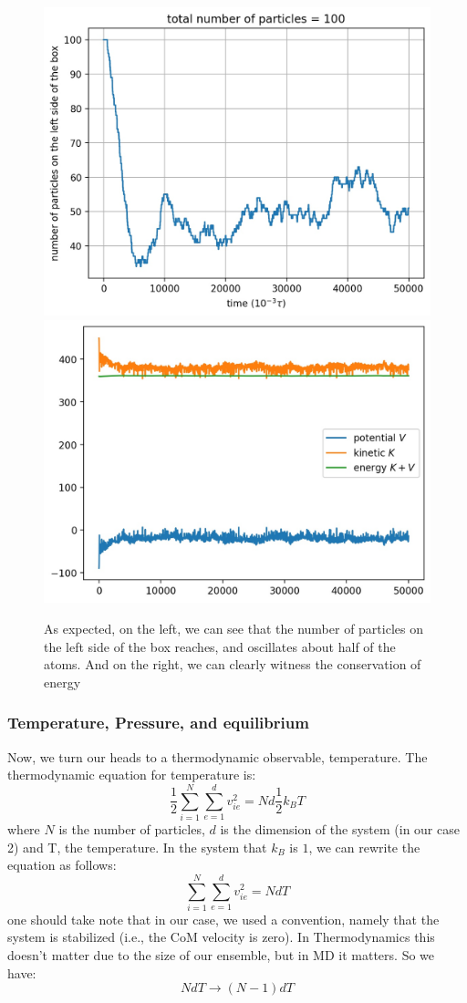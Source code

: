 \documentclass[12pt, a4paper]{article}
\begin{document}
	\begin{figure}[h!]
		\centering
		\includegraphics[width=.45\linewidth]{../results/particles_on_left100_50000.jpg}
		\includegraphics[width=.45\linewidth]{../results/energy_conservation100_50000.jpg}
		\caption{As expected, on the left, we can see that the number of particles on the 
		left side of the box reaches, and oscillates about half of the atoms. And on the right, we
		can clearly witness the conservation of energy}
		\label{fig:energy_and_left}
	\end{figure}

	\subsubsection{Temperature, Pressure, and equilibrium}
	Now, we turn our heads to a thermodynamic observable, temperature. The thermodynamic 
	equation for temperature is:
	\begin{equation}
		\frac{1}{2} \sum_{i=1}^{N}\sum_{e=1}^{d} v_{ie}^2 = Nd \frac{1}{2}k_B T
	\end{equation}
	where $N$ is the number of particles, $d$ is the dimension of the system (in our case 2) and 
	T, the temperature. In the system that $k_B$ is $1$, we can rewrite the equation as follows:
	\begin{equation}
		\sum_{i=1}^{N} \sum_{e=1}^{d} v_{ie}^2 = N d T
	\end{equation}
	one should take note that in our case, we used a convention, namely that the system is 
	stabilized (i.e., the CoM velocity is zero). In Thermodynamics this doesn't matter due to the 
	size of our ensemble, but in MD it matters. So we have:
	\begin{equation*}
		N d T \rightarrow (N-1) d T
	\end{equation*}
	
\end{document}

